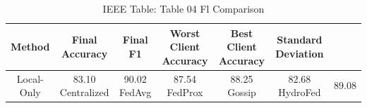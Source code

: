 \begin{table}[htbp]
\caption{IEEE Table: Table 04 Fl Comparison}
\label{tab:table_04_fl_comparison}
\centering
\begin{tabular}{|c|c|c|c|c|c|}
\hline
Method & Final Accuracy & Final F1 & Worst Client Accuracy & Best Client Accuracy & Standard Deviation \\
\hline\hline
Local-Only & 83.10%
\hline
Centralized & 90.02%
\hline
FedAvg & 87.54%
\hline
FedProx & 88.25%
\hline
Gossip & 82.68%
\hline
HydroFed & 89.08%
\hline
\end{tabular}
\end{table}
